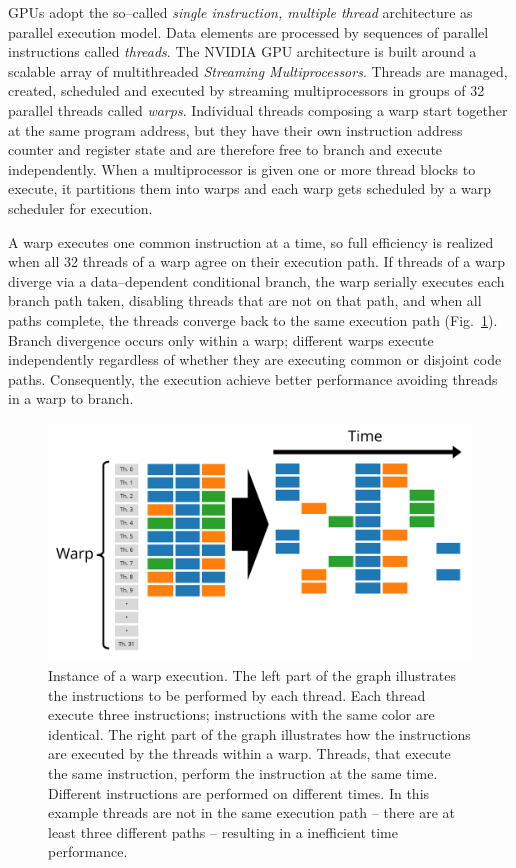 GPUs adopt the so--called \textit{single instruction, multiple thread} architecture as parallel execution model. Data elements are processed by sequences of parallel instructions called \textit{threads}. The NVIDIA GPU architecture is built around a scalable array of multithreaded \textit{Streaming Multiprocessors}. Threads are managed, created, scheduled and executed by streaming multiprocessors in groups of 32 parallel threads called \textit{warps}. Individual threads composing a warp start together at the same program address, but they have their own instruction address counter and register state and are therefore free to branch and execute independently. When a multiprocessor is given one or more thread blocks to execute, it partitions them into warps and each warp gets scheduled by a warp scheduler for execution. 

A warp executes one common instruction at a time, so full efficiency is realized when all 32 threads of a warp agree on their execution path. If threads of a warp diverge via a data--dependent conditional branch, the warp serially executes each branch path taken, disabling threads that are not on that path, and when all paths complete, the threads converge back to the same execution path (Fig.~\ref{fig:warp-instruction}). Branch divergence occurs only within a warp; different warps execute independently regardless of whether they are executing common or disjoint code paths. Consequently, the execution achieve better performance avoiding threads in a warp to branch.
\begin{figure}
   \centering
   \includegraphics[width=12cm]{Figs/Warp_instruction.png}
   \caption{Instance of a warp execution. The left part of the graph illustrates the instructions to be performed by each thread. Each thread execute three instructions; instructions with the same color are identical. The right part of the graph illustrates how the instructions are executed by the threads within a warp. Threads, that execute the same instruction, perform the instruction at the same time. Different instructions are performed on different times. In this example threads are not in the same execution path -- there are at least three different paths -- resulting in a inefficient time performance.} \label{fig:warp-instruction}
\end{figure}

